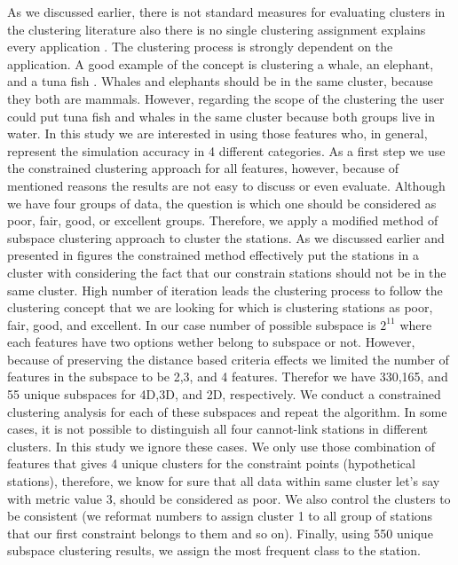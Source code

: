 As we discussed earlier, there is not standard measures for evaluating clusters in the clustering literature also there is no single clustering assignment explains every application \citep{Dy_2004_MLR,Jain_1988_Book,Hartigan_1985_JOC}. The clustering process is strongly dependent on the application. A good example of the concept is clustering a whale, an elephant, and a tuna fish \citep{Jain_1999,Watanabe_1985_Book}.  Whales and elephants should be in the same cluster, because they both are mammals. However, regarding the scope of the clustering the user could put tuna fish and whales in the same cluster because both groups live in water. In this study we are interested in using those features who, in general, represent the simulation accuracy in 4 different categories. As a first step we use the constrained \kmeans{} clustering approach for all features, however, because of mentioned reasons the results are not easy to discuss or even evaluate. Although we have four groups of data, the question is which one should be considered as poor, fair, good, or excellent groups. Therefore, we apply a modified method of subspace clustering approach to cluster the stations. As we discussed earlier and presented in figures the constrained \kmeans{} method effectively put the stations in a cluster with considering the fact that our constrain stations should not be in the same cluster. High number of iteration leads the clustering process to follow the clustering concept that we are looking for which is clustering stations as poor, fair, good, and excellent. In our case number of possible subspace is $2^{11}$ where each features have two options wether belong to subspace or not. However, because of preserving the distance based criteria effects we limited the number of features in the subspace to be 2,3, and 4 features. Therefor we have 330,165, and 55 unique subspaces for 4D,3D, and 2D, respectively. We conduct a constrained \kmeans{} clustering analysis for each of these subspaces and repeat the algorithm. In some cases, it is not possible to distinguish all four cannot-link stations in different clusters. In this study we ignore these cases. We only use those combination of features that gives 4 unique clusters for the constraint points (hypothetical stations), therefore, we know for sure that all data within same cluster let's say with metric value 3, should be considered as poor. We also control the clusters to be consistent (we reformat numbers to assign cluster 1 to all group of stations that our first constraint belongs to them and so on). Finally, using 550 unique subspace clustering results, we assign the most frequent class to the station. 


